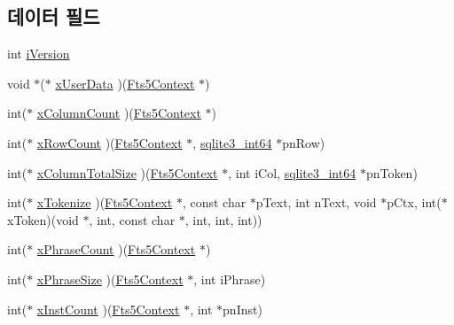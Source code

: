 \subsection*{데이터 필드}
\begin{DoxyCompactItemize}
\item 
int \hyperlink{struct_fts5_extension_api_af9c8f09c2e6f1373e6bce57ec9861682}{i\+Version}
\item 
void $\ast$($\ast$ \hyperlink{struct_fts5_extension_api_a8e651288d8e0cf25f20f2b838f47ac34}{x\+User\+Data} )(\hyperlink{sqlite3_8h_a97821b95ebebd43db901977ffd5b26bc}{Fts5\+Context} $\ast$)
\item 
int($\ast$ \hyperlink{struct_fts5_extension_api_a427409c50da4e179c8f2d36b22a4ba21}{x\+Column\+Count} )(\hyperlink{sqlite3_8h_a97821b95ebebd43db901977ffd5b26bc}{Fts5\+Context} $\ast$)
\item 
int($\ast$ \hyperlink{struct_fts5_extension_api_ae1eb7ad1d3c131a09376134ecc099568}{x\+Row\+Count} )(\hyperlink{sqlite3_8h_a97821b95ebebd43db901977ffd5b26bc}{Fts5\+Context} $\ast$, \hyperlink{sqlite3_8h_a0a4d3e6c1ad46f90e746b920ab6ca0d2}{sqlite3\+\_\+int64} $\ast$pn\+Row)
\item 
int($\ast$ \hyperlink{struct_fts5_extension_api_a096e79406ae03df9796a2082d0ac8269}{x\+Column\+Total\+Size} )(\hyperlink{sqlite3_8h_a97821b95ebebd43db901977ffd5b26bc}{Fts5\+Context} $\ast$, int i\+Col, \hyperlink{sqlite3_8h_a0a4d3e6c1ad46f90e746b920ab6ca0d2}{sqlite3\+\_\+int64} $\ast$pn\+Token)
\item 
int($\ast$ \hyperlink{struct_fts5_extension_api_a670af0d7715f69834376f8df187dcf30}{x\+Tokenize} )(\hyperlink{sqlite3_8h_a97821b95ebebd43db901977ffd5b26bc}{Fts5\+Context} $\ast$, const char $\ast$p\+Text, int n\+Text, void $\ast$p\+Ctx, int($\ast$x\+Token)(void $\ast$, int, const char $\ast$, int, int, int))
\item 
int($\ast$ \hyperlink{struct_fts5_extension_api_a3ba0207080a9ca498625eefcc120bf1e}{x\+Phrase\+Count} )(\hyperlink{sqlite3_8h_a97821b95ebebd43db901977ffd5b26bc}{Fts5\+Context} $\ast$)
\item 
int($\ast$ \hyperlink{struct_fts5_extension_api_aeda6faa66f47f9116c9ceba882aaedd2}{x\+Phrase\+Size} )(\hyperlink{sqlite3_8h_a97821b95ebebd43db901977ffd5b26bc}{Fts5\+Context} $\ast$, int i\+Phrase)
\item 
int($\ast$ \hyperlink{struct_fts5_extension_api_af57aff7a8aa8402bb37a77892c4daf45}{x\+Inst\+Count} )(\hyperlink{sqlite3_8h_a97821b95ebebd43db901977ffd5b26bc}{Fts5\+Context} $\ast$, int $\ast$pn\+Inst)
\item 

\end{DoxyCompactItemize}
